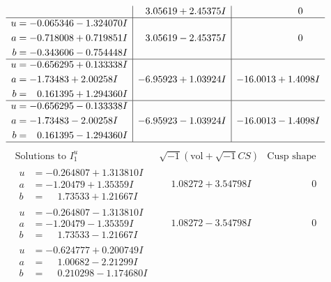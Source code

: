\documentclass[1p]{elsarticle_modified}
\theoremstyle{definition}
\newcommand{\I}{\sqrt{-1}}
\begin{document}
$$\begin{array}{c|c|c}
 & \phantom{-}3.05619 + 2.45375 I & \phantom{-0.000000 } 0 \\ \hline\begin{aligned}
u &= -0.065346 - 1.324070 I \\
a &= -0.718008 + 0.719851 I \\
b &= -0.343606 - 0.754448 I\end{aligned}
 & \phantom{-}3.05619 - 2.45375 I & \phantom{-0.000000 } 0 \\ \hline\begin{aligned}
u &= -0.656295 + 0.133338 I \\
a &= -1.73483 + 2.00258 I \\
b &= \phantom{-}0.161395 + 1.294360 I\end{aligned}
 & -6.95923 + 1.03924 I & -16.0013 + 1.4098 I \\ \hline\begin{aligned}
u &= -0.656295 - 0.133338 I \\
a &= -1.73483 - 2.00258 I \\
b &= \phantom{-}0.161395 - 1.294360 I\end{aligned}
 & -6.95923 - 1.03924 I & -16.0013 - 1.4098 I\\
 \hline 
 \end{array}$$\newpage$$\begin{array}{c|c|c}  
\text{Solutions to }I^u_{1}& \I (\text{vol} + \sqrt{-1}CS) & \text{Cusp shape}\\
 \hline 
\begin{aligned}
u &= -0.264807 + 1.313810 I \\
a &= -1.20479 + 1.35359 I \\
b &= \phantom{-}1.73533 + 1.21667 I\end{aligned}
 & \phantom{-}1.08272 + 3.54798 I & \phantom{-0.000000 } 0 \\ \hline\begin{aligned}
u &= -0.264807 - 1.313810 I \\
a &= -1.20479 - 1.35359 I \\
b &= \phantom{-}1.73533 - 1.21667 I\end{aligned}
 & \phantom{-}1.08272 - 3.54798 I & \phantom{-0.000000 } 0 \\ \hline\begin{aligned}
u &= -0.624777 + 0.200749 I \\
a &= \phantom{-}1.00682 - 2.21299 I \\
b &= \phantom{-}0.210298 - 1.174680 I\end{aligned}

\end{array}$$
\end{document}
